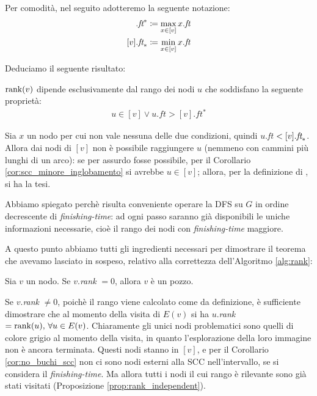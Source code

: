 Per comodità, nel seguito adotteremo la seguente notazione:
\begin{align*}
    [v].\emph{ft}^* &\coloneqq \max_{x \in [v]} x.\emph{ft}\\
    [v].\emph{ft}_* &\coloneqq \min_{x \in [v]} x.\emph{ft}
\end{align*}

Deduciamo il seguente risultato:
\begin{proposition}
    \label{prop:rank_independent}
    $\textup{rank}(v)$ dipende esclusivamente dal rango dei nodi $u$ che soddisfano la seguente proprietà:
    \begin{gather}
        u \in [v] \lor u.ft > [v].ft^* \label{rank_independency_formula}
    \end{gather}
\end{proposition}
\begin{proof2}
    Sia $x$  un nodo per cui non vale nessuna delle due condizioni, quindi $u$.\emph{ft} $< [v].\emph{ft}_*$. Allora dai nodi di $[v]$ non è possibile raggiungere $u$ (nemmeno con cammini più lunghi di un arco): se per assurdo fosse possibile, per il Corollario \ref{cor:scc_minore_inglobamento} si avrebbe $u \in [v]$; allora, per la definizione di \rankfunc, si ha la tesi.
\end{proof2}
Abbiamo spiegato perchè risulta conveniente operare la DFS su $G$ in ordine decrescente di \emph{finishing-time}: ad ogni passo saranno già disponibili le uniche informazioni necessarie, cioè il rango dei nodi con \emph{finishing-time} maggiore.

A questo punto abbiamo tutti gli ingredienti necessari per dimostrare il teorema che avevamo lasciato in sospeso, relativo alla correttezza dell'Algoritmo \ref{alg:rank}:
\begin{proof2}
    Sia $v$ un nodo. Se $v$.\emph{rank} $= 0$, allora $v$ è un pozzo.

    Se $v$.\emph{rank} $\neq 0$, poichè il rango viene calcolato come da definizione, è sufficiente dimostrare che al momento della visita di $E(v)$ si ha $u$.\emph{rank} $= \textup{rank}(u), \,\forall u \in E(v)$. Chiaramente gli unici nodi problematici sono quelli di colore grigio al momento della visita, in quanto l'esplorazione della loro immagine non è ancora terminata. Questi nodi stanno in $[v]$, e per il Corollario \ref{cor:no_buchi_scc} non ci sono nodi esterni alla SCC nell'intervallo, se si considera il \emph{finishing-time}. Ma allora tutti i nodi il cui rango è rilevante sono già stati visitati (Proposizione \ref{prop:rank_independent}).
\end{proof2}

